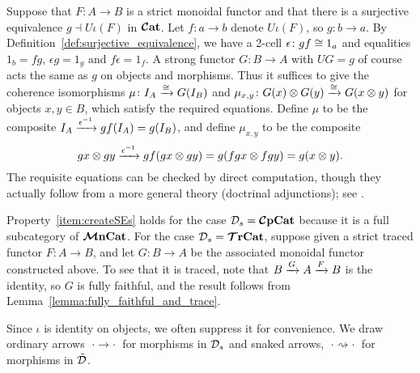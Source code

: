 \documentclass[11pt,oneside,article]{memoir}
\begin{document}
\begin{example}
Suppose that $F\colon A\to B$ is a strict monoidal functor and that there is a surjective
equivalence $g\dashv U\iota(F)$ in $\bm{\mathcal{C}}\mathbf{at}$. Let $f\colon a\to b$ denote $U\iota(F)$, so $g\colon
b\to a$. By Definition~\ref{def:surjective_equivalence}, we have a 2-cell $\epsilon\colon gf\cong
1_a$ and equalities $1_b=fg$, $\epsilon g=1_g$ and $f\epsilon=1_f$. A strong functor $G\colon B\to A$ with
$UG=g$ of course acts the same as $g$ on objects and morphisms. Thus it suffices to give the
coherence isomorphisms $\mu\colon I_A\xrightarrow{\cong}G(I_B)$ and $\mu_{x,y}\colon G(x)\otimes
G(y)\xrightarrow{\cong} G(x\otimes y)$ for objects $x,y\in B$, which satisfy the required equations. Define
$\mu$ to be the composite $I_A\xrightarrow{\epsilon^{-1}}gf(I_A)=g(I_B)$,
and define $\mu_{x,y}$ to be the composite
\begin{equation*}
   gx\otimes gy\xrightarrow{\epsilon^{-1}}gf(gx\otimes gy)=g(fgx\otimes fgy)=g(x\otimes y).
\end{equation*}
The requisite equations can be checked by direct computation, though they actually follow from a
more general theory (doctrinal adjunctions); see \cite{Kelly}. 

Property~\ref{item:createSEs} holds for the case $\mathcal{D}_s=\bm{\mathcal{C}}\mathbf{pCat}$ because it is a full
subcategory of $\bm{\mathcal{M}}\mathbf{nCat}$. For the case $\mathcal{D}_s=\bm{\mathcal{T}}\mathbf{rCat}$, suppose given a strict traced functor
$F\colon A\to B$, and let $G\colon B\to A$ be the associated monoidal functor constructed above. To
see that it is traced, note that $B\xrightarrow{G}A\xrightarrow{F}B$ is the identity, so $G$ is fully faithful, and
the result follows from Lemma~\ref{lemma:fully_faithful_and_trace}.

\end{example}

Since $\iota$ is identity on objects, we often suppress it for convenience. We draw ordinary arrows
$\;\cdot\to\cdot\;$ for morphisms in $\mathcal{D}_s$ and snaked arrows, $\;\cdot\rightsquigarrow\cdot\;$
for morphisms in $\tilde{\mathcal{D}}$.
\end{document}
